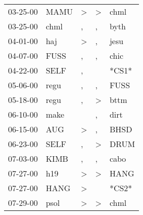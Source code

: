 \begin{supertabular}{p{0.07\textwidth}p{0.06\textwidth}p{0.02\textwidth}p{0.02\textwidth}p{0.06\textwidth}}
          03-25-00\textsuperscript{} &           MAMU\textsuperscript{} &     \textgreater &     \textgreater &           chml\textsuperscript{} \\
          03-25-00\textsuperscript{} &           chml\textsuperscript{} &                , &                , &           byth\textsuperscript{} \\
          04-01-00\textsuperscript{} &            haj\textsuperscript{} &     \textgreater &                , &           jesu\textsuperscript{} \\
          04-07-00\textsuperscript{} &           FUSS\textsuperscript{} &                , &                , &           chic\textsuperscript{} \\
          04-22-00\textsuperscript{} &           SELF\textsuperscript{} &                , &                  &                            *CS1* \\
          05-06-00\textsuperscript{} &           regu\textsuperscript{} &                , &                , &           FUSS\textsuperscript{} \\
          05-18-00\textsuperscript{} &           regu\textsuperscript{} &                , &     \textgreater &           bttm\textsuperscript{} \\
          06-10-00\textsuperscript{} &           make\textsuperscript{} &                  &                , &           dirt\textsuperscript{} \\
          06-15-00\textsuperscript{} &            AUG\textsuperscript{} &     \textgreater &                , &           BHSD\textsuperscript{} \\
          06-23-00\textsuperscript{} &           SELF\textsuperscript{} &                , &     \textgreater &           DRUM\textsuperscript{} \\
          07-03-00\textsuperscript{} &           KIMB\textsuperscript{} &                , &                , &           cabo\textsuperscript{} \\
          07-27-00\textsuperscript{} &            h19\textsuperscript{} &     \textgreater &     \textgreater &           HANG\textsuperscript{} \\
          07-27-00\textsuperscript{} &           HANG\textsuperscript{} &     \textgreater &                  &                            *CS2* \\
          07-29-00\textsuperscript{} &           psol\textsuperscript{} &     \textgreater &     \textgreater &           chml\textsuperscript{} \\

\end{supertabular}

